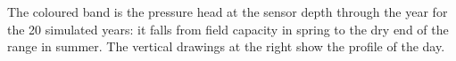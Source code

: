 
The coloured band is the pressure head at the sensor depth through the year for the 20 simulated years: it falls from field capacity in spring to the dry end of the range in summer. The vertical drawings at the right show the profile of the day.


